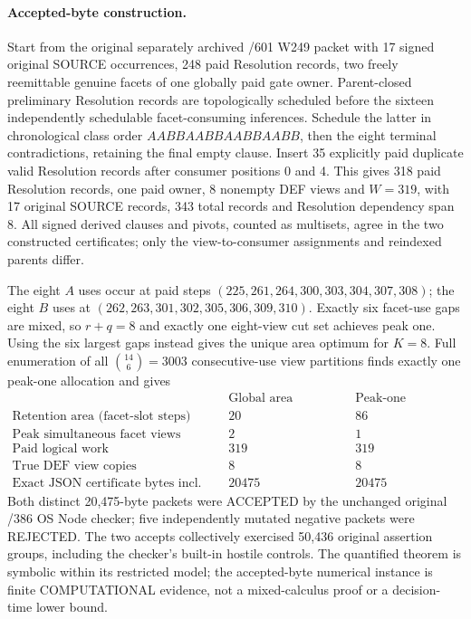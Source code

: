 \paragraph{Accepted-byte construction.}
Start from the original separately archived /601 W249 packet with 17 signed original SOURCE occurrences, 248 paid Resolution records, two freely reemittable genuine facets of one globally paid gate owner. Parent-closed preliminary Resolution records are topologically scheduled before the sixteen independently schedulable facet-consuming inferences. Schedule the latter in chronological class order $AABBAABBAABBAABB$, then the eight terminal contradictions, retaining the final empty clause. Insert 35 explicitly paid duplicate valid Resolution records after consumer positions 0 and 4. This gives 318 paid Resolution records, one paid owner, 8 nonempty DEF views and $W=319$, with 17 original SOURCE records, 343 total records and Resolution dependency span 8. All signed derived clauses and pivots, counted as multisets, agree in the two constructed certificates; only the view-to-consumer assignments and reindexed parents differ.

The eight $A$ uses occur at paid steps $(225,261,264,300,303,304,307,308)$; the eight $B$ uses at $(262,263,301,302,305,306,309,310)$. Exactly six facet-use gaps are mixed, so $r+q=8$ and exactly one eight-view cut set achieves peak one. Using the six largest gaps instead gives the unique area optimum for $K=8$. Full enumeration of all $\binom{14}{6}=3003$ consecutive-use view partitions finds exactly one peak-one allocation and gives
\[
\begin{array}{l|cc}
&\text{Global area optimum}&\text{Peak-one optimum}\\\hline
\text{Retention area (facet-slot steps)}&20&86\\
\text{Peak simultaneous facet views}&2&1\\
\text{Paid logical work}&319&319\\
\text{True DEF view copies}&8&8\\
\text{Exact JSON certificate bytes incl. LF}&20475&20475
\end{array}
\]
Both distinct 20,475-byte packets were ACCEPTED by the unchanged original /386 OS Node checker; five independently mutated negative packets were REJECTED. The two accepts collectively exercised 50,436 original assertion groups, including the checker's built-in hostile controls. The quantified theorem is symbolic within its restricted model; the accepted-byte numerical instance is finite COMPUTATIONAL evidence, not a mixed-calculus proof or a decision-time lower bound.

